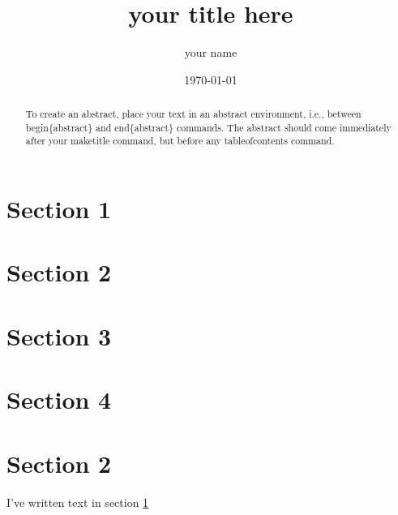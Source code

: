 \documentclass[titlepage]{article}
\title{your title here}
\author{your name}
\date{\today{}}
\begin{document}
\maketitle

\begin{abstract}
To create an abstract, place your text in an abstract environment, i.e., between begin\{abstract\} and end\{abstract\} commands. The abstract should come immediately after your maketitle command, but before any tableofcontents command.
\end{abstract}

\tableofcontents

\section{Section 1}\label{sec1}
\section{Section 2}
\section{Section 3}
\section{Section 4}
\section*{Section 2} %

I've written text in section \ref{sec1}
\end{document}
